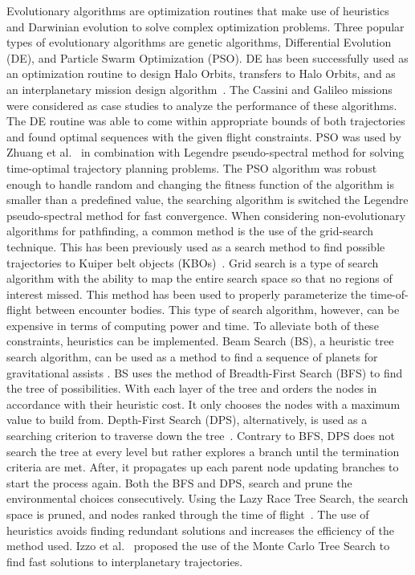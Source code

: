 \documentclass[letterpaper, preprint, paper,11pt]{AAS}	%
\begin{document}
Evolutionary algorithms are optimization routines that make use of heuristics and Darwinian evolution to solve complex optimization problems. Three popular types of evolutionary algorithms are genetic algorithms, Differential Evolution (DE), and Particle Swarm Optimization (PSO). DE has been successfully used as an optimization routine to design Halo Orbits, transfers to Halo Orbits, and as an interplanetary mission design algorithm~\cite{Nath2016, Olds2007}.  The Cassini and Galileo missions were considered as case studies to analyze the performance of these algorithms. The DE routine was able to come within appropriate bounds of both trajectories and found optimal sequences with the given flight constraints. PSO was used by Zhuang et al.~\cite{Zhuang2014} in combination with Legendre pseudo-spectral method for solving time-optimal trajectory planning problems. The PSO algorithm was robust enough to handle random and changing the fitness function of the algorithm is smaller than a predefined value, the searching algorithm is switched the Legendre pseudo-spectral method for fast convergence. When considering non-evolutionary algorithms for pathfinding, a common method is the use of the grid-search technique. This has been previously used as a search method to find possible trajectories to Kuiper belt objects (KBOs)~\cite{Penas2019}. Grid search is a type of search algorithm with the ability to map the entire search space so that no regions of interest missed. This method has been used to properly parameterize the time-of-flight between encounter bodies. This type of search algorithm, however, can be expensive in terms of computing power and time. To alleviate both of these constraints, heuristics can be implemented. Beam Search (BS), a heuristic tree search algorithm, can be used as a method to find a sequence of planets for gravitational assists \cite{Penas2019}. BS uses the method of Breadth-First Search (BFS) to find the tree of possibilities. With each layer of the tree and orders the nodes in accordance with their heuristic cost. It only chooses the nodes with a maximum value to build from. Depth-First Search (DPS), alternatively, is used as a searching criterion to traverse down the tree~\cite{Izzo2013}. Contrary to BFS, DPS does not search the tree at every level but rather explores a branch until the termination criteria are met. After, it propagates up each parent node updating branches to start the process again. Both the BFS and DPS, search and prune the environmental choices consecutively. Using the Lazy Race Tree Search, the search space is pruned, and nodes ranked through the time of flight~\cite{Izzo2013}. The use of heuristics avoids finding redundant solutions and increases the efficiency of the method used. Izzo et al.~\cite{Hennes2015} proposed the use of the Monte Carlo Tree Search to find fast solutions to interplanetary trajectories.
\end{document}
